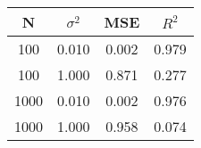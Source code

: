 \begin{tabular}{cccc}
\hline \hline
    N &  $\sigma^2$ &   MSE &  $R^2$ \\
\hline \hline
  100 &       0.010 & 0.002 &  0.979 \\
  100 &       1.000 & 0.871 &  0.277 \\
 1000 &       0.010 & 0.002 &  0.976 \\
 1000 &       1.000 & 0.958 &  0.074 \\
\hline \hline
\end{tabular}
